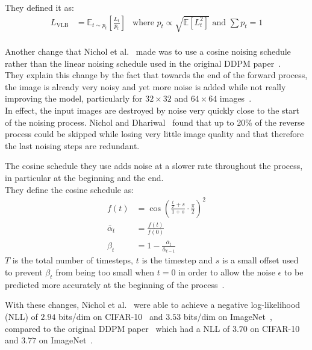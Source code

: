 \documentclass{article}
\numberwithin{equation}{section}
\numberwithin{figure}{section}
\begin{document}
They defined it as:
\begin{align}
  L_{\text{VLB}} &= \mathbb{E}_{t \sim p_t} \left[ \frac{L_t}{p_t} \right]
  &\text{where } p_t \propto \sqrt{\mathbb{E}\left[ L_t^2 \right]} \text{ and } \sum p_t = 1
\end{align}
\\
Another change that Nichol et al.~\cite{nichol2021improved} made was to use a cosine noising schedule rather than the linear noising schedule used in the original DDPM paper~\cite{ho2020denoising}. \\
They explain this change by the fact that towards the end of the forward process, the image is already very noisy and yet more noise is added while not really improving the model, particularly for $32 \times 32$ and $64 \times 64$ images~\cite{nichol2021improved}. \\
In effect, the input images are destroyed by noise very quickly close to the start of the noising process. Nichol and Dhariwal~\cite{nichol2021improved} found that up to 20\% of the reverse process could be skipped while losing very little image quality and that therefore the last noising steps are redundant. 

The cosine schedule they use adds noise at a slower rate throughout the process, in particular at the beginning and the end. \\
They define the cosine schedule as:
\begin{align}
  f(t) &= \cos \left( \frac{\frac{t}{T} + s}{1 + s} \cdot \frac{\pi}{2} \right)^2 \\
  \bar{\alpha}_t &= \frac{f(t)}{f(0)} \\
  \beta_t &= 1 - \frac{\bar{\alpha}_t}{\bar{\alpha}_{t-1}}
\end{align}
$T$ is the total number of timesteps, $t$ is the timestep and $s$ is a small offset used to prevent $\beta_t$ from being too small when $t = 0$ in order to allow the noise $\epsilon$ to be predicted more accurately at the beginning of the process~\cite{nichol2021improved}.

With these changes, Nichol et al.~\cite{nichol2021improved} were able to achieve a negative log-likelihood (NLL) of $2.94$ bits/dim on CIFAR-10~\cite{cifar10} and $3.53$ bits/dim on ImageNet~\cite{oord2016conditional}, compared to the original DDPM paper~\cite{ho2020denoising} which had a NLL of $3.70$ on CIFAR-10 and $3.77$ on ImageNet~\cite{nichol2021improved}.
\end{document}
